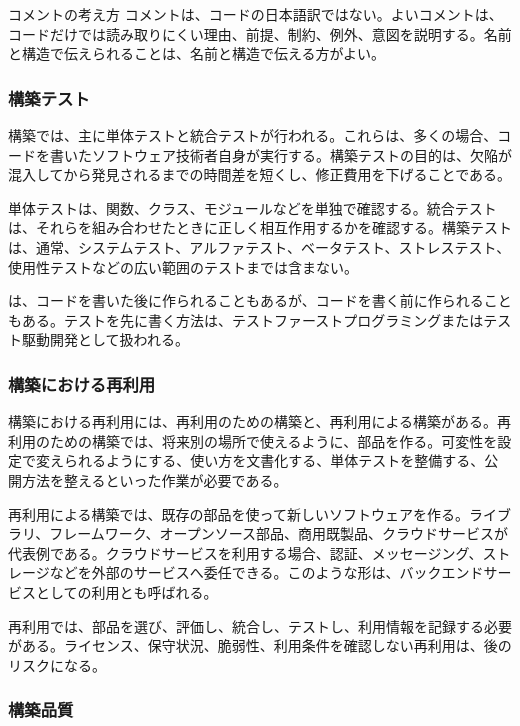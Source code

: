 \begin{keybox}{コメントの考え方}
コメントは、コードの日本語訳ではない。よいコメントは、コードだけでは読み取りにくい理由、前提、制約、例外、意図を説明する。名前と構造で伝えられることは、名前と構造で伝える方がよい。
\end{keybox}

\subsubsection{構築テスト}

構築では、主に単体テストと統合テストが行われる。これらは、多くの場合、コードを書いたソフトウェア技術者自身が実行する。構築テストの目的は、欠陥が混入してから発見されるまでの時間差を短くし、修正費用を下げることである。

単体テストは、関数、クラス、モジュールなどを単独で確認する。統合テストは、それらを組み合わせたときに正しく相互作用するかを確認する。構築テストは、通常、システムテスト、アルファテスト、ベータテスト、ストレステスト、使用性テストなどの広い範囲のテストまでは含まない。

は、コードを書いた後に作られることもあるが、コードを書く前に作られることもある。テストを先に書く方法は、テストファーストプログラミングまたはテスト駆動開発として扱われる。

\subsubsection{構築における再利用}

構築における再利用には、再利用のための構築と、再利用による構築がある。再利用のための構築では、将来別の場所で使えるように、部品を作る。可変性を設定で変えられるようにする、使い方を文書化する、単体テストを整備する、公開方法を整えるといった作業が必要である。

再利用による構築では、既存の部品を使って新しいソフトウェアを作る。ライブラリ、フレームワーク、オープンソース部品、商用既製品、クラウドサービスが代表例である。クラウドサービスを利用する場合、認証、メッセージング、ストレージなどを外部のサービスへ委任できる。このような形は、バックエンドサービスとしての利用とも呼ばれる。

再利用では、部品を選び、評価し、統合し、テストし、利用情報を記録する必要がある。ライセンス、保守状況、脆弱性、利用条件を確認しない再利用は、後のリスクになる。

\subsubsection{構築品質}

